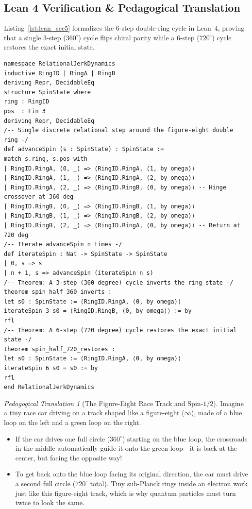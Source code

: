 \documentclass[11pt,a4paper]{article}
\theoremstyle{plain}
\theoremstyle{definition}
\theoremstyle{remark}
\newtheorem{analogy}{Pedagogical Translation}[section]
\begin{document}
\clearpage
\subsection{Lean 4 Verification \& Pedagogical Translation}
Listing~\ref{lst:lean_sec5} formalizes the $6$-step double-ring cycle in Lean~4, proving that a single $3$-step ($360^\circ$) cycle flips chiral parity while a $6$-step ($720^\circ$) cycle restores the exact initial state.
\begin{lstlisting}[caption={Lean 4 formalization of the $720^\circ$ spin-$1/2$ double-ring cycle.},label={lst:lean_sec5}]
namespace RelationalJerkDynamics
inductive RingID | RingA | RingB
deriving Repr, DecidableEq
structure SpinState where
ring : RingID
pos  : Fin 3
deriving Repr, DecidableEq
/-- Single discrete relational step around the figure-eight double ring -/
def advanceSpin (s : SpinState) : SpinState :=
match s.ring, s.pos with
| RingID.RingA, ⟨0, _⟩ => ⟨RingID.RingA, ⟨1, by omega⟩⟩
| RingID.RingA, ⟨1, _⟩ => ⟨RingID.RingA, ⟨2, by omega⟩⟩
| RingID.RingA, ⟨2, _⟩ => ⟨RingID.RingB, ⟨0, by omega⟩⟩ -- Hinge crossover at 360 deg
| RingID.RingB, ⟨0, _⟩ => ⟨RingID.RingB, ⟨1, by omega⟩⟩
| RingID.RingB, ⟨1, _⟩ => ⟨RingID.RingB, ⟨2, by omega⟩⟩
| RingID.RingB, ⟨2, _⟩ => ⟨RingID.RingA, ⟨0, by omega⟩⟩ -- Return at 720 deg
/-- Iterate advanceSpin n times -/
def iterateSpin : Nat -> SpinState -> SpinState
| 0, s => s
| n + 1, s => advanceSpin (iterateSpin n s)
/-- Theorem: A 3-step (360 degree) cycle inverts the ring state -/
theorem spin_half_360_inverts :
let s0 : SpinState := ⟨RingID.RingA, ⟨0, by omega⟩⟩
iterateSpin 3 s0 = ⟨RingID.RingB, ⟨0, by omega⟩⟩ := by
rfl
/-- Theorem: A 6-step (720 degree) cycle restores the exact initial state -/
theorem spin_half_720_restores :
let s0 : SpinState := ⟨RingID.RingA, ⟨0, by omega⟩⟩
iterateSpin 6 s0 = s0 := by
rfl
end RelationalJerkDynamics
\end{lstlisting}
\begin{analogy}[The Figure-Eight Race Track and Spin-$1/2$]
Imagine a tiny race car driving on a track shaped like a figure-eight ($\infty$), made of a blue loop on the left and a green loop on the right.
\begin{itemize}
\item If the car drives one full circle ($360^\circ$) starting on the blue loop, the crossroads in the middle automatically guide it onto the green loop—it is back at the center, but facing the opposite way!
\item To get back onto the blue loop facing its original direction, the car must drive a second full circle ($720^\circ$ total). Tiny sub-Planck rings inside an electron work just like this figure-eight track, which is why quantum particles must turn twice to look the same.
\end{itemize}
\end{analogy}
\end{document}
